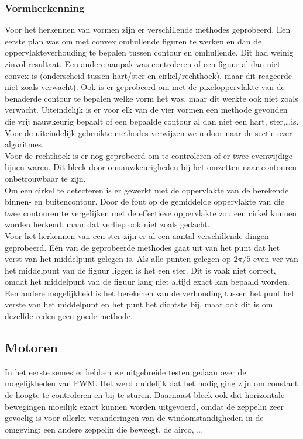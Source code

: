 \documentclass[eind]{penoverslag}
\begin{document}
\subsubsection{Vormherkenning}
Voor het herkennen van vormen zijn er verschillende methodes geprobeerd. Een eerste plan was om met convex omhullende figuren te werken en dan de oppervlakteverhouding te bepalen tussen contour en omhullende. Dit had weinig zinvol resultaat. Een andere aanpak was controleren of een figuur al dan niet convex is (onderscheid tussen hart/ster en cirkel/rechthoek), maar dit reageerde niet zoals verwacht). Ook is er geprobeerd om met de pixeloppervlakte van de benaderde contour te bepalen welke vorm het was, maar dit werkte ook niet zoals verwacht. Uiteindelijk is er voor elk van de vier vormen een methode gevonden die vrij nauwkeurig bepaalt of een bepaalde contour al dan niet een hart, ster,\ldots is. Voor de uiteindelijk gebruikte methodes verwijzen we u door naar de sectie over algoritmes.\\
Voor de rechthoek is er nog geprobeerd om te controleren of er twee evenwijdige lijnen waren. Dit bleek door onnauwkeurigheden bij het omzetten naar contouren onbetrouwbaar te zijn. \\
Om een cirkel te detecteren is er gewerkt met de oppervlakte van de berekende binnen- en buitencontour. Door de fout op de gemiddelde oppervlakte van die twee contouren te vergelijken met de effectieve oppervlakte zou een cirkel kunnen worden herkend, maar dat verliep ook niet zoals gedacht. \\
Voor het herkennen van een ster zijn er al een aantal verschillende dingen geprobeerd. E\'en van de geprobeerde methodes gaat uit van het punt dat het verst van het middelpunt gelegen is. Als alle punten gelegen op $2\pi/5$ even ver van het middelpunt van de figuur liggen is het een ster. Dit is vaak niet correct, omdat het middelpunt van de figuur lang niet altijd exact kan bepaald worden. Een andere mogelijkheid is het berekenen van de verhouding tussen het punt het verste van het middelpunt en het punt het dichtste bij, maar ook dit is om dezelfde reden geen goede methode.

\subsection{Motoren}
In het eerste semester hebben we uitgebreide testen gedaan over de mogelijkheden van PWM. Het werd duidelijk dat het nodig ging zijn om constant de hoogte te controleren en bij te sturen. Daarnaast bleek ook dat horizontale bewegingen moeilijk exact kunnen worden uitgevoerd, omdat de zeppelin zeer gevoelig is voor allerlei veranderingen van de windomstandigheden in de omgeving: een andere zeppelin die beweegt, de airco, \ldots \\
\end{document}
